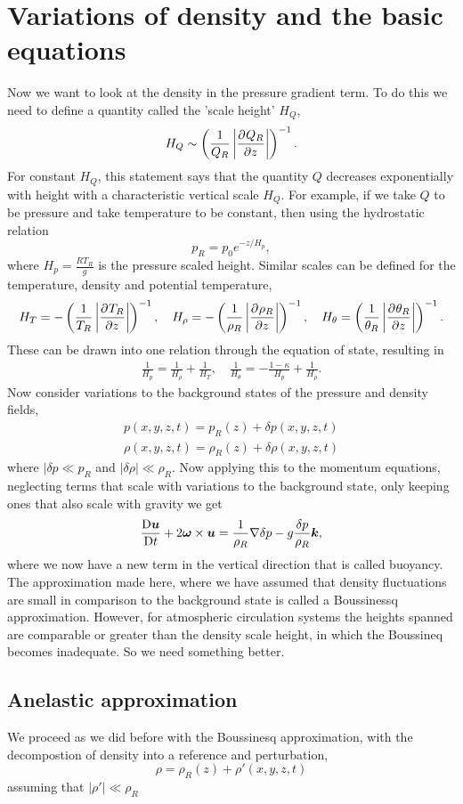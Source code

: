 \section{Variations of density and the basic equations} 
Now we want to look at the density in the pressure gradient term. To do this we need to define a quantity called the 'scale height' $H_Q$, $$H_Q\sim\left(\frac{1}{Q_R}\left|\displaystyle \frac{\partial^{} Q_R}{\partial z^{}}\right|\right)^{-1}.$$
For constant $H_Q$, this statement says that the quantity $Q$ decreases exponentially with height with a characteristic vertical scale $H_Q$. For example, if we take $Q$ to be pressure and take temperature to be constant, then using the hydrostatic relation $$p_R=p_0e^{-z/H_p},$$ where $\displaystyle H_p=\frac{R T_R}{g}$ is the pressure scaled height. Similar scales can be defined for the temperature, density and potential temperature, 
\begin{gather*}
    H_T=-\left(\frac{1}{T_R}\left|\displaystyle \frac{\partial^{} T_R}{\partial z^{}}\right|\right)^{-1},\quad H_\rho=-\left(\frac{1}{\rho_R}\left|\displaystyle \frac{\partial^{} \rho_R}{\partial z^{}}\right|\right)^{-1},\quad H_\theta=\left(\frac{1}{\theta_R}\left|\displaystyle \frac{\partial^{} \theta_R}{\partial z^{}}\right|\right)^{-1}.
\end{gather*}
These can be drawn into one relation through the equation of state, resulting in 
\begin{gather*}
\frac{1}{H_p}=\frac{1}{H_\rho}+\frac{1}{H_T}, \quad
\frac{1}{H_\theta}=-\frac{1-\kappa}{H_p}+\frac{1}{H_\rho}.
\end{gather*}
Now consider variations to the background states of the pressure and density fields, 
\begin{gather*}
    p(x,y,z,t)=p_R(z)+\delta p(x,y,z,t)\\
    \rho(x,y,z,t)=\rho_R(z)+\delta \rho(x,y,z,t)
\end{gather*}
where $|\delta p\ll p_R$ and $|\delta\rho|\ll\rho_R$. Now applying this to the momentum equations, neglecting terms that scale with variations to the background state, only keeping ones that also scale with gravity we get 
\begin{gather*}
    \displaystyle \frac{{\rm D} \bm{u}}{{\rm D} t}+2\bm{\omega}\times\bm{u} = \frac{1}{\rho_R}\nabla\delta p - g\frac{\delta p}{\rho_R}\bm{k},
\end{gather*}
where we now have a new term in the vertical direction that is called buoyancy. The approximation made here, where we have assumed that density fluctuations are small in comparison to the background state is called a Boussinessq approximation. However, for atmospheric circulation systems the heights spanned are comparable or greater than the density scale height, in which the Boussineq becomes inadequate. So we need something better. 
\subsection{Anelastic approximation} 
We proceed as we did before with the Boussinesq approximation, with the decompostion of density into a reference and perturbation, $$\rho = \rho_R(z)+\rho'(x,y,z,t)$$ assuming that $|\rho'|\ll \rho_R$
\printbibliography 

